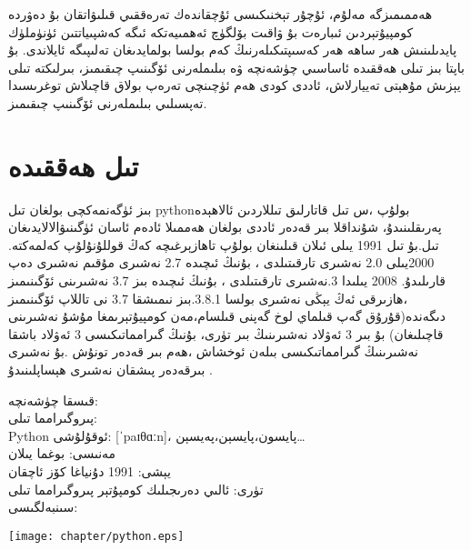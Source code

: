 
\par\bigskip
\begin{tcolorbox}
ھەممىمىزگە مەلۇم، ئۇچۇر تېخنىكىسى ئۇچقاندەك تەرەققىي قىلىۋاتقان بۇ دەۋردە كومپيۇتېردىن ئىبارەت بۇ ۋاقىت بۆلگۈچ ئەھمىيەتكە ئىگە كەشپىياتتىن ئۈنۈملۈك پايدىلىنىش ھەر ساھە ھەر كەسىپتىكىلەرنىڭ كەم بولسا بولمايدىغان تەلىپىگە ئايلاندى.
بۇ باپتا بىز \PY تىلى ھەققىدە ئاساسىي چۈشەنچە ۋە بىلىملەرنى ئۆگىنىپ چىقىمىز، بىرلىكتە \PY تىلى يېزىش مۇھېتى تەييارلاش، ئاددى \PY كودى ھەم ئۈچىنچى تەرەپ بولاق قاچىلاش توغرىسىدا تەپسىلىي بىلىملەرنى ئۆگىنىپ چىقىمىز.

\end{tcolorbox}

\section{تىل ھەققىدە}

بىز ئۈگەنمەكچى بولغان تىل  pythonبولۇپ ،س تىل قاتارلىق تىللاردىن ئالاھېدە پەرىقلىنىدۇ، شۇنداقلا بىر قەدەر ئاددى بولغان ھەممىلا ئادەم ئاسان ئۈگىنىۋالالايدىغان تىل.بۇ تىل 1991 يىلى ئىلان قىلىنغان بولۇپ تاھازېرغىچە كەڭ قوللۇنۇلۇپ كەلمەكتە. 2000يىلى 2.0 نەشىرى تارقىتىلدى ، بۇنىڭ ئىچىدە 2.7 نەشىرى مۇقىم نەشىرى دەپ قارىلىدۇ. 2008 يىلىدا 3.نەشىرى تارقىتىلدى ، بۇنىڭ ئىچىدە بىز 3.7 نەشىرىنى ئۆگىنىمىز ،ھازىرقى ئەڭ يېڭى نەشىرى بولسا 3.8.1.بىز نىمىشقا 3.7 نى تاللاپ ئۆگىنىمىز دىگەندە(قۇرۇق گەپ قىلماي لوخ گەپنى قىلسام،مەن كومپيۇتېرىمغا مۇشۇ نەشىرىنى قاچىلىغان) بۇ بىر 3 ئەۋلاد نەشىرىنىڭ بىر تۈرى، بۇنىڭ گىرامماتىكىسى 3 ئەۋلاد باشقا نەشىرىنىڭ گىرامماتىكىسى بىلەن ئوخشاش ،ھەم بىر قەدەر تونۇش .بۇ نەشىرى بىرقەدەر پىشقان نەشىرى ھېساپلىنىدۇ . 

\begin{multicols}{2}
قىسقا چۈشەنچە:\\
پىروگىرامما تىلى: \\Python
ئوقۇلۇشى: [ˈpaɪθɑːn]، پايسون،پايسېن،پەيسېن…\\
مەنىسى: بوغما يىلان\\
يېشى: 1991 دۇنياغا كۆز ئاچقان\\
تۈرى: ئالىي دەرىجىلىك كومپۇتېر پىروگىرامما تىلى\\
سىنبەلگىسى:\\
\begin{center}
\texttt{[image: chapter/python.eps]}
\end{center}
\end{multicols}

